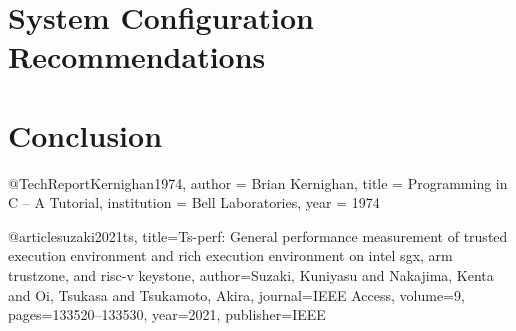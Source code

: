 \documentclass[english, version-2020-11]{uzl-thesis}
\begin{document}
\chapter{System Configuration Recommendations}


\chapter{Conclusion}
%

\begin{bibtex-entries}
@TechReport{Kernighan1974,
author = {Brian Kernighan},
title = {Programming in C – A Tutorial},
institution = {Bell Laboratories},
year = {1974}
}

@article{suzaki2021ts,
  title={Ts-perf: General performance measurement of trusted execution environment and rich execution environment on intel sgx, arm trustzone, and risc-v keystone},
  author={Suzaki, Kuniyasu and Nakajima, Kenta and Oi, Tsukasa and Tsukamoto, Akira},
  journal={IEEE Access},
  volume={9},
  pages={133520--133530},
  year={2021},
  publisher={IEEE}
}

\end{bibtex-entries}
\end{document}
